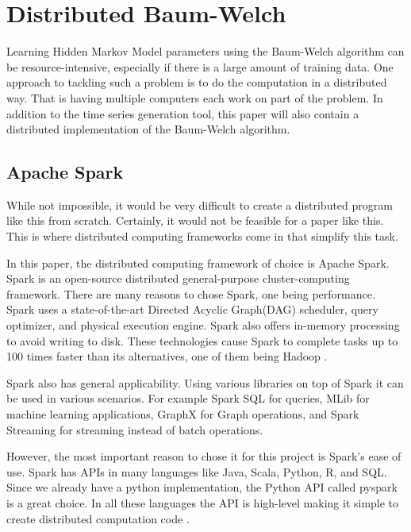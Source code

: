 
\chapter{Distributed Baum-Welch}\label{chapter:hmm-dist}

Learning Hidden Markov Model parameters using the Baum-Welch algorithm can be resource-intensive, especially if there is a large amount of training data. One approach to tackling such a problem is to do the computation in a distributed way. That is having multiple computers each work on part of the problem. In addition to the time series generation tool, this paper will also contain a distributed implementation of the Baum-Welch algorithm. 

\section{Apache Spark}

While not impossible, it would be very difficult to create a distributed program like this from scratch. Certainly, it would not be feasible for a paper like this. This is where distributed computing frameworks come in that simplify this task. 

In this paper, the distributed computing framework of choice is Apache Spark. Spark is an open-source distributed general-purpose cluster-computing framework. There are many reasons to chose Spark, one being performance. Spark uses a state-of-the-art Directed Acyclic Graph(DAG) scheduler, query optimizer, and physical execution engine. Spark also offers in-memory processing to avoid writing to disk. These technologies cause Spark to complete tasks up to 100 times faster than its alternatives, one of them being Hadoop \parencite{zaharia2016apache}.

Spark also has general applicability. Using various libraries on top of Spark it can be used in various scenarios. For example Spark SQL for queries, MLib for machine learning applications, GraphX for Graph operations, and Spark Streaming for streaming instead of batch operations. 

However, the most important reason to chose it for this project is Spark's ease of use. Spark has APIs in many languages like Java, Scala, Python, R, and SQL. Since we already have a python implementation, the Python API called pyspark is a great choice. In all these languages the API is high-level making it simple to create distributed computation code \parencite{pyspark}.

